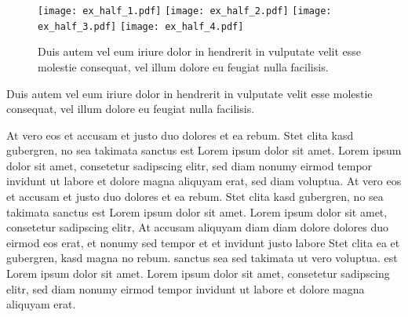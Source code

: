 \documentclass[twocolumn,floatfix]{revtex4-1}
\begin{document}
\begin{figure}
\centering
\texttt{[image: ex\_half\_1.pdf]}%
\texttt{[image: ex\_half\_2.pdf]}
\texttt{[image: ex\_half\_3.pdf]}%
\texttt{[image: ex\_half\_4.pdf]}
\caption{
Duis autem vel eum iriure dolor in hendrerit in vulputate velit esse molestie consequat, vel illum dolore eu feugiat nulla facilisis. }
\end{figure}

Duis autem vel eum iriure dolor in hendrerit in vulputate velit esse molestie consequat, vel illum dolore eu feugiat nulla facilisis. 

At vero eos et accusam et justo duo dolores et ea rebum. Stet clita kasd gubergren, no sea takimata sanctus est Lorem ipsum dolor sit amet. Lorem ipsum dolor sit amet, consetetur sadipscing elitr, sed diam nonumy eirmod tempor invidunt ut labore et dolore magna aliquyam erat, sed diam voluptua. At vero eos et accusam et justo duo dolores et ea rebum. Stet clita kasd gubergren, no sea takimata sanctus est Lorem ipsum dolor sit amet. Lorem ipsum dolor sit amet, consetetur sadipscing elitr, At accusam aliquyam diam diam dolore dolores duo eirmod eos erat, et nonumy sed tempor et et invidunt justo labore Stet clita ea et gubergren, kasd magna no rebum. sanctus sea sed takimata ut vero voluptua. est Lorem ipsum dolor sit amet. Lorem ipsum dolor sit amet, consetetur sadipscing elitr, sed diam nonumy eirmod tempor invidunt ut labore et dolore magna aliquyam erat. 
\end{document}

